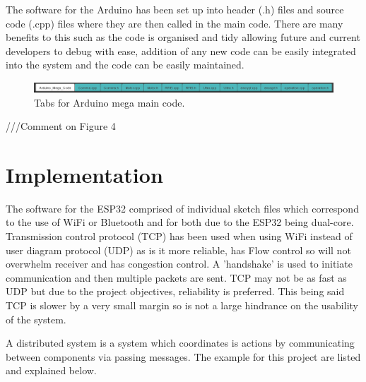 \documentclass[8pt, a4paper]{article}
\begin{document}
The software for the Arduino has been set up into header (.h) files and source code (.cpp) files where they are then called in the main code. There are many benefits to this such as the code is organised and tidy allowing future and current developers to debug with ease, addition of any new code can be easily integrated into the system and the code can be easily maintained. 

\begin{figure}[H]
	\includegraphics[width=17cm]{tabs}
	\caption{Tabs for Arduino mega main code.}
\end{figure}

///Comment on Figure 4 



\section{Implementation}

The software for the ESP32 comprised of individual sketch files which correspond to the use of WiFi or Bluetooth and for both due to the ESP32 being dual-core. Transmission control protocol (TCP) has been used when using WiFi instead of user diagram protocol (UDP) as is it more reliable, has Flow control so will not overwhelm receiver and has congestion control. A 'handshake' is used to initiate communication and then multiple packets are sent. TCP may not be as fast as UDP but due to the project objectives, reliability is preferred. This being said TCP is slower by a very small margin so is not a large hindrance on the usability of the system. 


A distributed system is a system which coordinates is actions by communicating between components via passing messages. The example for this project are listed and explained below.
\end{document}
